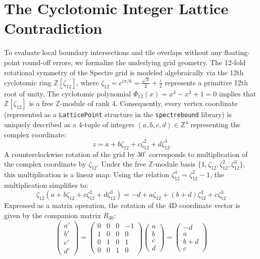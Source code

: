 \documentclass[11pt, a4paper]{amsart}
\begin{document}
\section{The Cyclotomic Integer Lattice Contradiction}
To evaluate local boundary intersections and tile overlaps without any floating-point round-off errors, we formalize the underlying grid geometry. The 12-fold rotational symmetry of the Spectre grid is modeled algebraically via the 12th cyclotomic ring $\mathbb{Z}[\zeta_{12}]$, where $\zeta_{12} = e^{i\pi/6} = \frac{\sqrt{3}}{2} + \frac{i}{2}$ represents a primitive 12th root of unity. The cyclotomic polynomial $\Phi_{12}(x) = x^4 - x^2 + 1 = 0$ implies that $\mathbb{Z}[\zeta_{12}]$ is a free $\mathbb{Z}$-module of rank 4. Consequently, every vertex coordinate (represented as a \texttt{LatticePoint} structure in the \texttt{spectrebound} library) is uniquely described as a 4-tuple of integers $(a, b, c, d) \in \mathbb{Z}^4$ representing the complex coordinate:
\begin{equation}
z = a + b\zeta_{12} + c\zeta_{12}^2 + d\zeta_{12}^3
\end{equation}
A counterclockwise rotation of the grid by $30^\circ$ corresponds to multiplication of the complex coordinate by $\zeta_{12}$. Under the free $\mathbb{Z}$-module basis $\{1, \zeta_{12}, \zeta_{12}^2, \zeta_{12}^3\}$, this multiplication is a linear map. Using the relation $\zeta_{12}^4 = \zeta_{12}^2 - 1$, the multiplication simplifies to:
\begin{equation}
\zeta_{12}(a + b\zeta_{12} + c\zeta_{12}^2 + d\zeta_{12}^3) = -d + a\zeta_{12} + (b + d)\zeta_{12}^2 + c\zeta_{12}^3
\end{equation}
Expressed as a matrix operation, the rotation of the 4D coordinate vector is given by the companion matrix $R_{30}$:
\begin{equation}
\begin{pmatrix} a' \\ b' \\ c' \\ d' \end{pmatrix} = \begin{pmatrix} 0 & 0 & 0 & -1 \\ 1 & 0 & 0 & 0 \\ 0 & 1 & 0 & 1 \\ 0 & 0 & 1 & 0 \end{pmatrix} \begin{pmatrix} a \\ b \\ c \\ d \end{pmatrix} = \begin{pmatrix} -d \\ a \\ b + d \\ c \end{pmatrix}
\end{equation}
\end{document}
